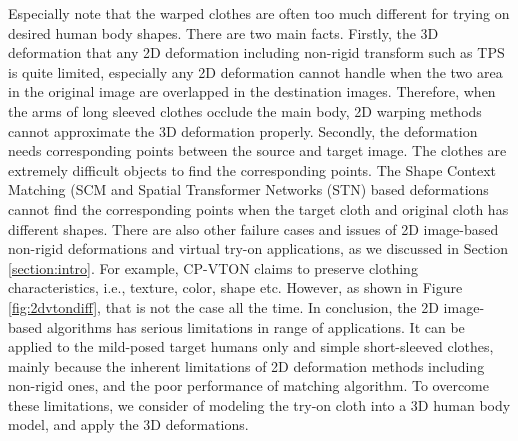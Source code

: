 Especially note that the warped clothes are often too much different for trying on desired human body shapes. There are two main facts. Firstly, the 3D deformation that any 2D deformation including non-rigid transform such as TPS is quite limited, especially any 2D deformation cannot handle when the two area in the original image are overlapped in the destination images. Therefore, when the arms of long sleeved clothes occlude the main body, 2D warping methods cannot approximate the 3D deformation properly. Secondly, the deformation needs corresponding points between the source and target image. The clothes are extremely difficult objects to find the corresponding points. The Shape Context Matching (SCM\cite{BelongieMP02} and Spatial Transformer Networks (STN)\cite{JaderbergSZK15} based deformations cannot find the corresponding points when the target cloth and original cloth has different shapes. There are also other failure cases and issues of 2D image-based non-rigid deformations and virtual try-on applications, as we discussed in Section \ref{section:intro}. For example, CP-VTON\cite{Wang2018TowardCI} claims to preserve clothing characteristics, i.e., texture, color, shape etc. However, as shown in Figure \ref{fig:2dvtondiff}, that is not the case all the time. In conclusion, the 2D image-based algorithms has serious limitations in range of applications. It can be applied to the mild-posed target humans only and simple short-sleeved clothes, mainly because the inherent limitations of 2D deformation methods including non-rigid ones, and the poor performance of matching algorithm.  To overcome these limitations, we consider of modeling the try-on cloth into a 3D human body model, and apply the 3D deformations.


